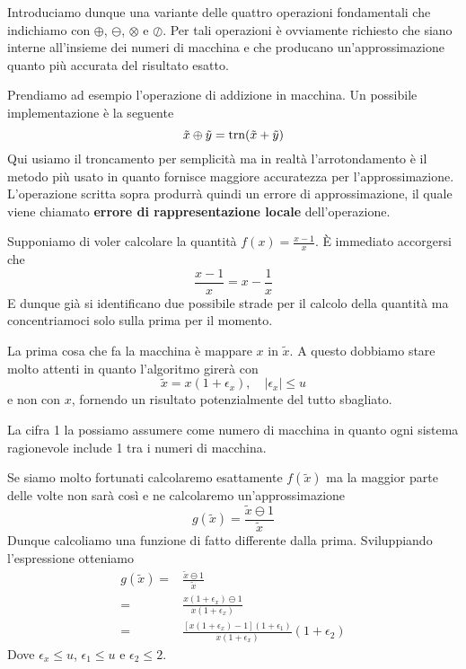 Introduciamo dunque una variante delle quattro operazioni fondamentali che indichiamo con $\oplus$, $\ominus$,
$\otimes$ e $\oslash$. Per tali operazioni è ovviamente richiesto che siano interne all'insieme dei numeri
di macchina e che producano un'approssimazione quanto più accurata del risultato esatto.

Prendiamo ad esempio l'operazione di addizione in macchina. Un possibile implementazione è la seguente
\[ \tilde{x} \oplus \tilde{y} = \operatorname{trn}(\tilde{x} + \tilde{y}) \]
Qui usiamo il troncamento per semplicità ma in realtà l'arrotondamento è il metodo più usato in quanto fornisce
maggiore accuratezza per l'approssimazione. L'operazione scritta sopra produrrà quindi un errore di
approssimazione, il quale viene chiamato \textbf{errore di rappresentazione locale} dell'operazione.

\begin{example}
	Supponiamo di voler calcolare la quantità $f(x) = \frac{x - 1}{x}$. \`E immediato accorgersi che
	\[ \frac{x - 1}{x} = x - \frac{1}{x} \]
	E dunque già si identificano due possibile strade per il calcolo della quantità ma concentriamoci solo
	sulla prima per il momento.

	La prima cosa che fa la macchina è mappare $x$ in $\tilde{x}$. A questo dobbiamo stare molto attenti in
	quanto l'algoritmo girerà con
	\[ \tilde{x} = x (1 + \epsilon_x), \quad |\epsilon_x| \leq u \]
	e non con $x$, fornendo un risultato potenzialmente del tutto sbagliato.

	La cifra 1 la possiamo assumere come numero di macchina in quanto ogni sistema ragionevole include 1 tra
	i numeri di macchina.

	Se siamo molto fortunati calcolaremo esattamente $f(\tilde{x})$ ma la maggior parte delle volte non sarà
	così e ne calcolaremo un'approssimazione
	\[ g(\tilde{x}) = \frac{\tilde{x} \ominus 1}{\tilde{x}} \]
	Dunque calcoliamo una funzione di fatto differente dalla prima. Sviluppiando l'espressione otteniamo
	\begin{align*}
		g(\tilde{x})  = & \frac{\tilde{x} \ominus 1}{\tilde{x}}                                                \\
		=               & \frac{x (1 + \epsilon_x) \ominus 1}{x (1 + \epsilon_x)}                              \\
		=               & \frac{[x (1 + \epsilon_x) - 1](1 + \epsilon_1)}{x (1 + \epsilon_x)} (1 + \epsilon_2)
	\end{align*}
	Dove $\epsilon_x \leq u$, $\epsilon_1 \leq u$ e $\epsilon_2 \leq 2$.
\end{example}
